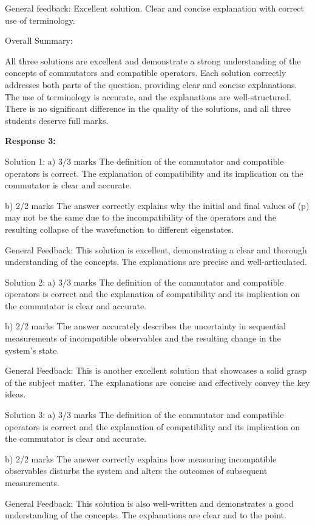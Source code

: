 \documentclass[a4paper,11pt]{article}
\begin{document}
General feedback: Excellent solution. Clear and concise explanation with correct use of terminology.

Overall Summary:

All three solutions are excellent and demonstrate a strong understanding of the concepts of commutators and compatible operators. Each solution correctly addresses both parts of the question, providing clear and concise explanations. The use of terminology is accurate, and the explanations are well-structured. There is no significant difference in the quality of the solutions, and all three students deserve full marks.

\textbf{Response 3:}

Solution 1:
a) 3/3 marks
The definition of the commutator and compatible operators is correct. The explanation of compatibility and its implication on the commutator is clear and accurate.

b) 2/2 marks
The answer correctly explains why the initial and final values of (p) may not be the same due to the incompatibility of the operators and the resulting collapse of the wavefunction to different eigenstates.

General Feedback: This solution is excellent, demonstrating a clear and thorough understanding of the concepts. The explanations are precise and well-articulated.

Solution 2:
a) 3/3 marks
The definition of the commutator and compatible operators is correct and the explanation of compatibility and its implication on the commutator is clear and accurate.

b) 2/2 marks
The answer accurately describes the uncertainty in sequential measurements of incompatible observables and the resulting change in the system's state.

General Feedback: This is another excellent solution that showcases a solid grasp of the subject matter. The explanations are concise and effectively convey the key ideas.

Solution 3:
a) 3/3 marks
The definition of the commutator and compatible operators is correct and the explanation of compatibility and its implication on the commutator is clear and accurate.

b) 2/2 marks
The answer correctly explains how measuring incompatible observables disturbs the system and alters the outcomes of subsequent measurements.

General Feedback: This solution is also well-written and demonstrates a good understanding of the concepts. The explanations are clear and to the point.
\end{document}
